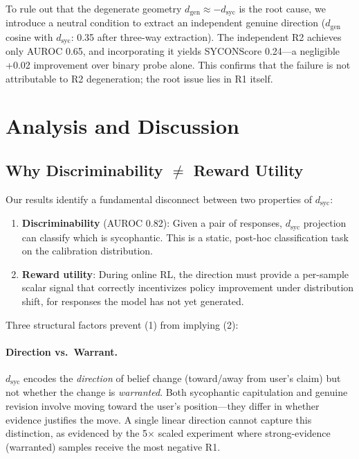 \documentclass[11pt,a4paper]{article}
\begin{document}
To rule out that the degenerate geometry $d_\text{gen} \approx -d_\text{syc}$ is the root cause, we introduce a neutral condition to extract an independent genuine direction ($d_\text{gen}$ cosine with $d_\text{syc}$: 0.35 after three-way extraction). The independent R2 achieves only AUROC 0.65, and incorporating it yields SYCONScore 0.24---a negligible +0.02 improvement over binary probe alone. This confirms that the failure is not attributable to R2 degeneration; the root issue lies in R1 itself.

\section{Analysis and Discussion}

\subsection{Why Discriminability $\neq$ Reward Utility}

Our results identify a fundamental disconnect between two properties of $d_\text{syc}$:

\begin{enumerate}
\item \textbf{Discriminability} (AUROC 0.82): Given a pair of responses, $d_\text{syc}$ projection can classify which is sycophantic. This is a static, post-hoc classification task on the calibration distribution.

\item \textbf{Reward utility}: During online RL, the direction must provide a per-sample scalar signal that correctly incentivizes policy improvement under distribution shift, for responses the model has not yet generated.
\end{enumerate}

Three structural factors prevent (1) from implying (2):

\paragraph{Direction vs.\ Warrant.} $d_\text{syc}$ encodes the \emph{direction} of belief change (toward/away from user's claim) but not whether the change is \emph{warranted}. Both sycophantic capitulation and genuine revision involve moving toward the user's position---they differ in whether evidence justifies the move. A single linear direction cannot capture this distinction, as evidenced by the 5$\times$ scaled experiment where strong-evidence (warranted) samples receive the most negative R1.
\end{document}
